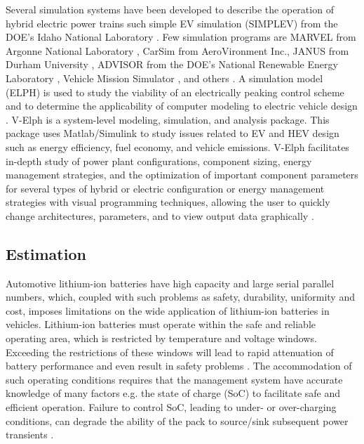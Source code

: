 Several simulation systems have been
developed to describe the operation of hybrid electric power
trains such simple EV simulation (SIMPLEV) from
the DOE’s Idaho National Laboratory \cite{ZS_col}. Few simulation programs are MARVEL from
Argonne National Laboratory \cite{ZS_wal}, CarSim from AeroVironment
Inc., JANUS from Durham University \cite{ZS_bum}, ADVISOR
from the DOE’s National Renewable Energy Laboratory \cite{ZS_wip},
Vehicle Mission Simulator \cite{ZS_noo}, and others \cite{ZS_aue,ZS_kri}. A
simulation model (ELPH) is used to study the viability of an electrically
peaking control scheme and to determine the applicability of
computer modeling to electric vehicle design \cite{ZS_bun}. V-Elph \cite{ZS_ste,ZS_but} is a system-level modeling, simulation,
and analysis package. This package uses Matlab/Simulink to study issues related to EV and
HEV design such as energy efficiency, fuel economy, and
vehicle emissions. V-Elph facilitates in-depth study of power
plant configurations, component sizing, energy management
strategies, and the optimization of important component parameters
for several types of hybrid or electric configuration
or energy management strategies with visual programming
techniques, allowing the user to quickly change architectures,
parameters, and to view output data graphically \cite{Butler:TVT99}.

\subsection{Estimation}

Automotive lithium-ion batteries have high capacity and large serial parallel
numbers, which, coupled with such problems as safety,
durability, uniformity and cost, imposes limitations on the wide
application of lithium-ion batteries in vehicles. Lithium-ion
batteries must operate within the safe and reliable operating area, which is restricted by temperature and voltage windows. Exceeding the restrictions of these windows will lead to rapid
attenuation of battery performance and even result in safety
problems \cite{ZS_lu}. The accommodation
of such operating conditions requires that the management system have accurate knowledge of  many factors e.g. the  state of charge (SoC) to facilitate safe and efficient operation.
Failure to control SoC, leading to under- or over-charging
conditions, can degrade the ability of the pack to source/sink
subsequent power transients \cite{ZS_bha}.

